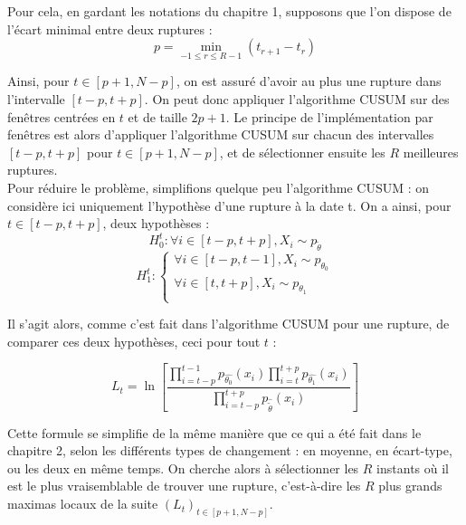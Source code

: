 \documentclass[french,11pt,notitlepage]{report}
\begin{document}
	Pour cela, en gardant les notations du chapitre 1, supposons que l'on dispose de l'écart minimal entre deux ruptures :
	\begin{equation*}
		p = \min_{-1 \leq r \leq R-1} (t_{r+1} - t_r)
	\end{equation*}
	
	Ainsi, pour $t \in [p+1, N-p]$, on est assuré d'avoir au plus une rupture dans l'intervalle $[t-p, t+p]$.
	On peut donc appliquer l'algorithme CUSUM sur des fenêtres centrées en $t$ et de taille $2p+1$.
	Le principe de l'implémentation par fenêtres est alors d'appliquer l'algorithme CUSUM sur chacun des intervalles $[t-p,t+p]$ pour $t \in [p+1, N-p]$, et de sélectionner ensuite les $R$ meilleures ruptures.
	\\
	
	Pour réduire le problème, simplifions quelque peu l'algorithme CUSUM :
	on considère ici uniquement l'hypothèse d'une rupture à la date t.
	On a ainsi, pour $t \in [t-p,t+p]$, deux hypothèses :
	\begin{equation*}
			H_0^t : \forall i \in [t-p, t+p], X_i \sim p_{\tilde{\theta}}
	\end{equation*}
	\begin{equation*}
			H_1^t : 
			\left\{ \begin{array}{ll}
				\forall i \in [t-p, t-1], X_i \sim p_{\theta_0} \\ \forall i \in [t, t+p], X_i \sim p_{\theta_1} \\
			\end{array} \right.
	\end{equation*}
	
	Il s'agit alors, comme c'est fait dans l'algorithme CUSUM pour une rupture, de comparer ces deux hypothèses, ceci pour tout $t$ :
	
	\begin{equation}
		L_t = \ln \left[ \frac{\prod_{i = t-p}^{t-1} p_{\hat{\theta_0}}(x_i) \prod_{i = t}^{t+p} p_{\hat{\theta_1}}(x_i)}{\prod_{i = t-p}^{t+p} p_{\hat{\tilde{\theta}}}(x_i)} \right]
	\end{equation}
	
	Cette formule se simplifie de la même manière que ce qui a été fait dans le chapitre 2, selon les différents types de changement :
	en moyenne, en écart-type, ou les deux en même temps. 
	On cherche alors à sélectionner les $R$ instants où il est le plus vraisemblable de trouver une rupture,
	c'est-à-dire les $R$ plus grands maximas locaux de la suite $(L_t)_{t\in[p+1, N-p]}$.
	
\end{document}
